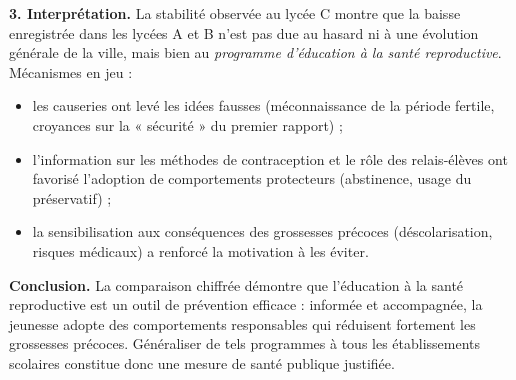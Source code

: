\documentclass[11pt]{article}
\begin{document}
\begin{exoresolu}
\textbf{3. Interprétation.} La stabilité observée au lycée C montre que la baisse enregistrée dans les lycées A et B n'est pas due au hasard ni à une évolution générale de la ville, mais bien au \emph{programme d'éducation à la santé reproductive}. Mécanismes en jeu :
\begin{itemize}
\item les causeries ont levé les idées fausses (méconnaissance de la période fertile, croyances sur la « sécurité » du premier rapport) ;
\item l'information sur les méthodes de contraception et le rôle des relais-élèves ont favorisé l'adoption de comportements protecteurs (abstinence, usage du préservatif) ;
\item la sensibilisation aux conséquences des grossesses précoces (déscolarisation, risques médicaux) a renforcé la motivation à les éviter.
\end{itemize}

\textbf{Conclusion.} La comparaison chiffrée démontre que l'éducation à la santé reproductive est un outil de prévention efficace : informée et accompagnée, la jeunesse adopte des comportements responsables qui réduisent fortement les grossesses précoces. Généraliser de tels programmes à tous les établissements scolaires constitue donc une mesure de santé publique justifiée.
\end{exoresolu}
\end{document}
